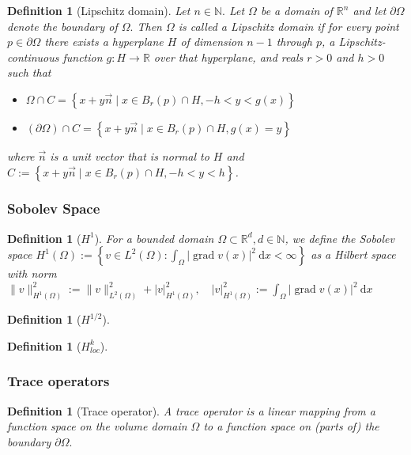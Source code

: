 \documentclass[10pt,journal,compsoc, onecolumn]{IEEEtran}
\newtheorem{definition}[theorem]{Definition}
\begin{document}
\begin{definition}[Lipschitz domain]
Let \(n \in \mathbb{N} .\) Let \(\Omega\) be a domain of \(\mathbb{R}^{n}\) and let \(\partial \Omega\) denote the boundary of \(\Omega .\) Then \(\Omega\) is called a Lipschitz domain if for every point \(p \in \partial \Omega\) there exists a hyperplane \(H\) of dimension \(n-1\) through \(p\), a Lipschitz-continuous function \(g: H \rightarrow \mathbb{R}\) over that hyperplane, and reals \(r>0\) and \(h>0\) such that
\begin{itemize}
    \item \(\Omega \cap C=\left\{x+y \vec{n} \mid x \in B_{r}(p) \cap H,-h<y<g(x)\right\}\)
    \item \((\partial \Omega) \cap C=\left\{x+y \vec{n} \mid x \in B_{r}(p) \cap H, g(x)=y\right\}\)
\end{itemize}
where \(\vec{n}\) is a unit vector that is normal to \(H\) and \(C:=\left\{x+y \vec{n} \mid x \in B_{r}(p) \cap H,-h<y<h\right\}\).
\end{definition}


\subsubsection{Sobolev Space}
\begin{definition}[$H^1$]
For a bounded domain \(\Omega \subset \mathbb{R}^{d}, d \in \mathbb{N}\), we define the Sobolev space \(H^{1}(\Omega):=\left\{v \in L^{2}(\Omega): \int_{\Omega}|\operatorname{grad} v(x)|^{2} \mathrm{~d} x<\infty\right\}\) as a Hilbert space with norm \(\|v\|_{H^{1}(\Omega)}^{2}:=\|v\|_{L^{2}(\Omega)}^{2}+|v|_{H^{1}(\Omega)}^{2}, \quad|v|_{H^{1}(\Omega)}^{2}:=\int_{\Omega}|\operatorname{grad} v(x)|^{2} \mathrm{~d} x\)
\end{definition}






\begin{definition}[$H^{1/2}$]

\end{definition}

\begin{definition}[$H^k_{loc}$]

\end{definition}

\subsubsection{Trace operators}
\begin{definition}[Trace operator]
A trace operator is a linear mapping from a function space on the volume domain \(\Omega\) to a function space on (parts of) the boundary \(\partial \Omega .\)
\end{definition}
\end{document}
